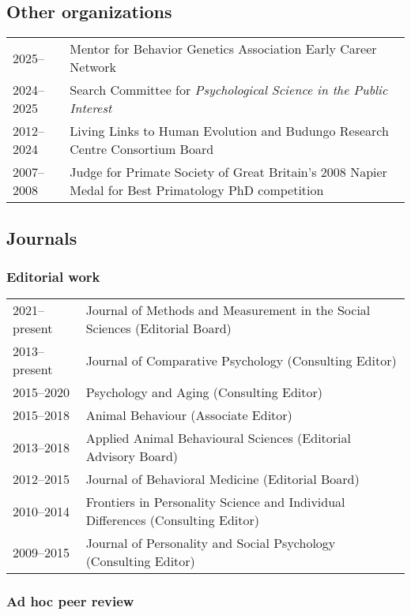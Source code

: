 \documentclass[11pt]{article}
\begin{document}
\subsection*{Other organizations}
\begin{tabular}{p{3cm}p{12cm}}
2025-- & Mentor for Behavior Genetics Association Early Career Network \\
2024--2025 & Search Committee for \textit{Psychological Science in the
       Public Interest} \\
2012--2024 & Living Links to Human Evolution and Budungo Research
Centre Consortium Board \\
2007--2008 & Judge for Primate Society of Great Britain's 2008 Napier Medal
for Best Primatology PhD competition
\end{tabular}

\subsection*{Journals}

\subsubsection*{Editorial work}

\begin{tabular}{p{3cm}p{12cm}}
2021--present & Journal of Methods and Measurement in the Social
                Sciences (Editorial Board) \\
2013--present & Journal of Comparative Psychology (Consulting Editor) \\
2015--2020 & Psychology and Aging (Consulting Editor) \\
2015--2018 & Animal Behaviour (Associate Editor) \\
2013--2018 & Applied Animal Behavioural Sciences (Editorial Advisory Board) \\
2012--2015 & Journal of Behavioral Medicine (Editorial Board) \\
2010--2014 & Frontiers in Personality Science and Individual
Differences (Consulting Editor) \\
2009--2015 & Journal of Personality and Social Psychology (Consulting Editor)
\end{tabular}

\subsubsection*{Ad hoc peer review}
\end{document}
